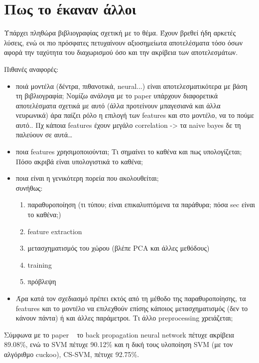 \section{Πως το έκαναν άλλοι}

Υπάρχει πληθώρα βιβλιογραφίας σχετική με το θέμα. Έχουν βρεθεί ήδη
αρκετές λύσεις, ενώ οι πιο πρόσφατες πετυχαίνουν αξιοσημείωτα
αποτελέσματα τόσο όσων αφορά την ταχύτητα του διαχωρισμού όσο και την
ακρίβεια των αποτελεσμάτων.

Πιθανές αναφορές:
\begin{itemize}[noitemsep]
\item ποιά μοντέλα (δέντρα, πιθανοτικά, neural...) είναι
  αποτελεσματικότερα με βάση τη βιβλιογραφία; Νομίζω ανάλογα με το
  paper υπάρχουν διαφορετικά αποτελέσματα σχετικά με αυτό (άλλα
  προτείνουν μπαγεσιανά και άλλα νευρωνικά) άρα παίζει ρόλο η επιλογή
  των features και στο μοντέλο, να το πούμε αυτό.. Πχ κάποια features
  έχουν μεγάλο correlation -> τα naive bayes δε τη παλεύουν σε αυτά…
  
\item ποια features χρησιμοποιούνται; Τι σημαίνει το καθένα και πως
  υπολογίζεται; Πόσο ακριβά είναι υπολογιστικά το καθένα;
  
\item ποια είναι η γενικότερη πορεία που ακολουθείται;\\
  συνήθως:
  
  \begin{enumerate}[noitemsep]
  \item παραθυροποίηση (τι τύπου; είναι επικαλυπτόμενα τα παράθυρα;
    πόσα sec είναι το καθένα;)
  \item feature extraction
  \item μετασχηματισμός του χώρου (βλέπε PCA και άλλες μεθόδους)
  \item training
  \item πρόβλεψη
  \end{enumerate}
  
\item Άρα κατά τον σχεδιασμό πρέπει εκτός από τη μέθοδο της
  παραθυροποίησης, τα features και το μοντέλο να επιλεχθούν επίσης
  κάποιος μετασχηματισμός (δεν το κάνουν πάντα) ή και άλλες
  παράμετροι. Τι άλλο preprocessing χρειάζεται;
    
\end{itemize}

Σύμφωνα με το paper ~\cite{cuckoo} το back propagation neural network πέτυχε
ακρίβεια 89.08\%, ενώ το SVM πέτυχε 90.12\% και η δική τους υλοποίηση
SVM (με τον αλγόριθμο cuckoo), CS-SVM, πέτυχε 92.75\%.
